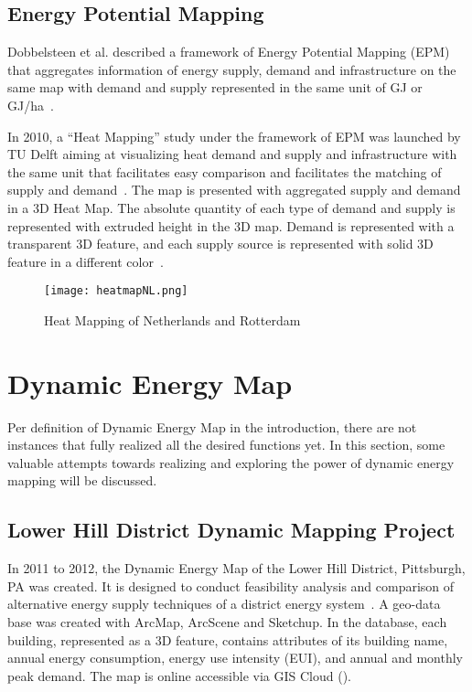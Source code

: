 \subsection{Energy Potential Mapping}
Dobbelsteen et al. described a framework of Energy Potential Mapping
(EPM) that aggregates information of energy supply, demand and
infrastructure on the same map with demand and supply represented in
the same unit of GJ or GJ/ha~\cite{Dobbelsteen2013}.

In 2010, a ``Heat Mapping'' study under the framework of EPM was
launched by TU Delft aiming at visualizing heat demand and supply and
infrastructure with the same unit that facilitates easy comparison and
facilitates the matching of supply and
demand~\cite{Dobbelsteen2013}. The map is presented with aggregated
supply and demand in a 3D Heat Map. The absolute quantity of each type
of demand and supply is represented with extruded height in the 3D
map. Demand is represented with a transparent 3D feature, and each
supply source is represented with solid 3D feature in a different
color~\cite{Dobbelsteen2013}.

\begin{figure}[htbp]
  \centering
  \texttt{[image: heatmapNL.png]}
  \caption[Rotterdam Heat Map]{Heat Mapping of Netherlands and
    Rotterdam~\cite{Dobbelsteen2013}}
  \label{fig:heatmapNL}
\end{figure}

\section{Dynamic Energy Map}\label{dynamicMap}
Per definition of Dynamic Energy Map in the introduction, there are
not instances that fully realized all the desired functions yet. In
this section, some valuable attempts towards realizing and exploring
the power of dynamic energy mapping will be discussed.

\subsection{Lower Hill District Dynamic Mapping Project}
In 2011 to 2012, the Dynamic Energy Map of the Lower Hill District,
Pittsburgh, PA was created. It is designed to conduct feasibility
analysis and comparison of alternative energy supply techniques of a
district energy system~\cite{baird2014, Ramesh2013}. A geo-data base
was created with ArcMap, ArcScene and Sketchup. In the database, each
building, represented as a 3D feature, contains attributes of its
building name, annual energy consumption, energy use intensity (EUI),
and annual and monthly peak demand. The map is online accessible via
GIS Cloud ().

